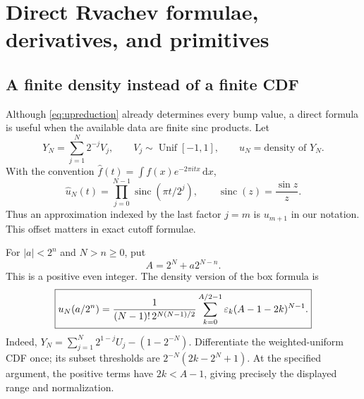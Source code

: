 \documentclass[11pt,oneside]{article}
\theoremstyle{definition}\newtheorem{definition}[theorem]{Definition}
\theoremstyle{remark}\newtheorem{remark}[theorem]{Remark}
\newcommand{\dd}{\,\mathrm d}\newcommand{\Comp}{\operatorname{Comp}}
\begin{document}
\section{Direct Rvachev formulae, derivatives, and primitives}
\label{sec:up}

\subsection{A finite density instead of a finite CDF}
Although \eqref{eq:upreduction} already determines every bump value, a direct
formula is useful when the available data are finite sinc products. Let
\begin{equation}
 Y_N=\sum_{j=1}^{N}2^{-j}V_j,\qquad V_j\sim\operatorname{Unif}[-1,1],
 \qquad u_N=\text{density of }Y_N.
 \label{eq:upspline}
\end{equation}
With the convention $\widehat f(t)=\int f(x)e^{-2\pi itx}\dd x$,
\begin{equation}
 \widehat u_N(t)=\prod_{j=0}^{N-1}
       \operatorname{sinc}(\pi t/2^j),\qquad
 \operatorname{sinc}(z)=\frac{\sin z}{z}.
 \label{eq:sincfinite}
\end{equation}
Thus an approximation indexed by the last factor $j=m$ is $u_{m+1}$ in
our notation. This offset matters in exact cutoff formulae.

For $|a|<2^n$ and $N>n\ge0$, put
\begin{equation}
 A=2^N+a2^{N-n}.
 \label{eq:upA}
\end{equation}
This is a positive even integer. The density version of the box formula is
\begin{equation}
 \boxed{\displaystyle
 u_N(a/2^n)=
 \frac{1}{(N-1)!\,2^{N(N-1)/2}}
 \sum_{k=0}^{A/2-1}\varepsilon_k(A-1-2k)^{N-1}.}
 \label{eq:upsplineexplicit}
\end{equation}
Indeed, $Y_N=\sum_{j=1}^N2^{1-j}U_j-(1-2^{-N})$. Differentiate the
weighted-uniform CDF once; its subset thresholds are
$2^{-N}(2k-2^N+1)$. At the specified argument, the positive terms have
$2k<A-1$, giving precisely the displayed range and normalization.
\end{document}
